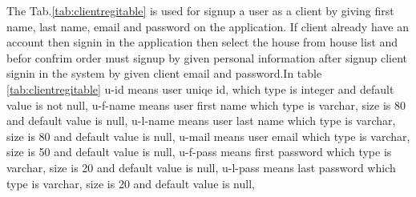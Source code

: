 \documentclass[12pt,a4paper]{article}
\begin{document}
\begin{table}[H]
\begin{tabular}{M{0.6cm}|M{1.5cm}|M{2cm}|M{1cm}|M{1cm}|M{2.5cm}|M{3.2cm}N}
	\end{tabular}
	\end{table}The Tab.\ref{tab:clientregitable} is used for signup a user as a client by giving first name, last name, email and password on the application. If client already have an account then signin in the application then select the house from house list and befor confrim order must signup by given personal information after signup client signin in the system by given client email and password.In table \ref{tab:clientregitable} u-id means user uniqe id, which type is integer and default value is not null, u-f-name means user first name which type is varchar, size is 80 and default value is null, u-l-name means user last name which type is varchar, size is 80 and default value is null, u-mail means user email which type is varchar, size is 50 and default value is null, u-f-pass means first password which type is varchar, size is 20 and default value is null, u-l-pass means last password which type is varchar, size is 20 and default value is null,
\end{document}
